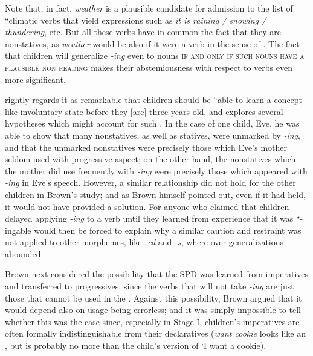 \noindent Note that, in fact, \textit{weather} is a plausible candidate for admission to the list of ``climatic verbs that yield expressions such as \textit{it is raining / snowing / thundering}, etc. But all these verbs have in common the fact that they are nonstatives, as \textit{weather} would be also if it were a verb in the sense of . The fact that children will generalize \textit{-ing} even to nouns \textsc{if and only if such nouns have a plausible non reading} makes their abstemiousness with respect to  verbs even more significant.

\citet[326ff]{Brown1973} rightly regards it as remarkable that chil\-dren should be ``able to learn a concept like involuntary state before they [are] three years old, and explores several hypotheses which might account for such . In the case of one child, Eve, he was able to show that many nonstatives, as well as statives, were unmarked by \textit{-ing}, and that the unmarked nonstatives were precisely those which Eve's mother seldom used with progressive aspect; on the other hand, the nonstatives which the mother did use frequently with \textit{-ing} were precisely those which appeared with \textit{-ing} in Eve's speech. However, a similar relationship did not hold for the other children in Brown's study; and as Brown himself pointed out, even if it had held, it would not have provided a solution. For anyone who claimed that children delayed applying \textit{-ing} to a verb until they learned from experience that it was ``-ingable would then be forced to explain why a similar caution and restraint was not applied to other morphemes, like \textit{-ed} and \textit{-s}, where over-generalizations abounded.

Brown next considered the possibility that the SPD was learned from imperatives and transferred to progressives, since the verbs that will not take \textit{-ing} are just those that cannot be used in the . Against this possibility, Brown argued that it would depend also on  usage being errorless; and it was simply impossible to tell whether this was the case since, especially in Stage I, children's impera\-tives are often formally indistinguishable from their declaratives (\textit{want cookie} looks like an , but is probably no more than the child's version of `I want a cookie).

